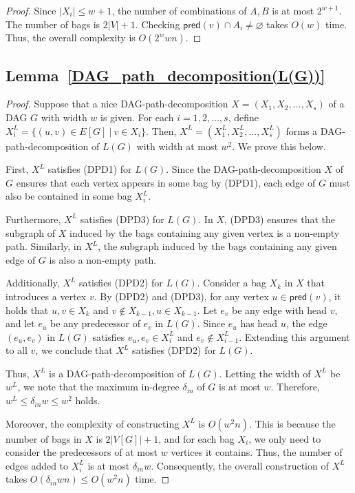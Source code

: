 \documentclass[runningheads]{llncs}
\theoremstyle{plain}
\theoremstyle{definition}
\begin{document}
\begin{proof}
    Since $|X_i| \leq w+1$, the number of combinations of $A, B$ is at most $2^{w+1}$. The number of bags is $2|V|+1$. Checking $\mathsf{pred}(v) \cap A_i \neq \varnothing$ takes $O(w)$ time. Thus, the overall complexity is $O(2^w w n)$.
\end{proof}

\subsection{\textbf{Lemma~\ref{DAG_path_decomposition(L(G))}}}\label{appendix_B1}
\begin{proof}
    Suppose that a nice DAG-path-decomposition $X=(X_1, X_2, \dots, X_s)$ of a DAG $G$ with width $w$ is given. For each $i=1, 2, \dots, s$, define $X^L_i = \{(u, v) \in E[G]~|~v \in X_i \}$. Then, $X^L=(X^L_1, X^L_2, \dots, X^L_s)$ forms a DAG-path-decomposition of $L(G)$ with width at most $w^2$. We prove this below. 
    
    First, $X^L$ satisfies (DPD1) for $L(G)$. Since the DAG-path-decomposition $X$ of $G$ ensures that each vertex appears in some bag by (DPD1), each edge of $G$ must also be contained in some bag $X^L_i$. 
    
    Furthermore, $X^L$ satisfies (DPD3) for $L(G)$. In $X$, (DPD3) ensures that the subgraph of $X$ induced by the bags containing any given vertex is a non-empty path. Similarly, in $X^L$, the subgraph induced by the bags containing any given edge of $G$ is also a non-empty path.
    
    Additionally, $X^L$ satisfies (DPD2) for $L(G)$. Consider a bag $X_k$ in $X$ that introduces a vertex $v$. By (DPD2) and (DPD3), for any vertex $u \in \mathsf{pred}(v)$, it holds that $u, v \in X_k$ and $v \notin X_{k-1}, u \in X_{k-1}$. Let $e_v$ be any edge with head $v$, and let $e_u$ be any predecessor of $e_v$ in $L(G)$. Since $e_u$ has head $u$, the edge $(e_u, e_v)$ in $L(G)$ satisfies $e_u, e_v \in X^L_i$ and $e_v \notin X^L_{i-1}$. Extending this argument to all $v$, we conclude that $X^L$ satisfies (DPD2) for $L(G)$. 
    
    Thus, $X^L$ is a DAG-path-decomposition of $L(G)$. Letting the width of $X^L$ be $w^L$, we note that the maximum in-degree $\delta_{in}$ of $G$ is at most $w$. Therefore, $w^L \leq \delta_{in} w \leq w^2$ holds. 

    Moreover, the complexity of constructing $X^L$ is $O(w^2n)$. This is because the number of bags in $X$ is $2|V[G]|+1$, and for each bag $X_i$, we only need to consider the predecessors of at most $w$ vertices it contains. Thus, the number of edges added to $X^L_i$ is at most $\delta_{in}w$. Consequently, the overall construction of $X^L$ takes $O(\delta_{in}wn) \leq O(w^2n)$ time.
\end{proof}
\end{document}
